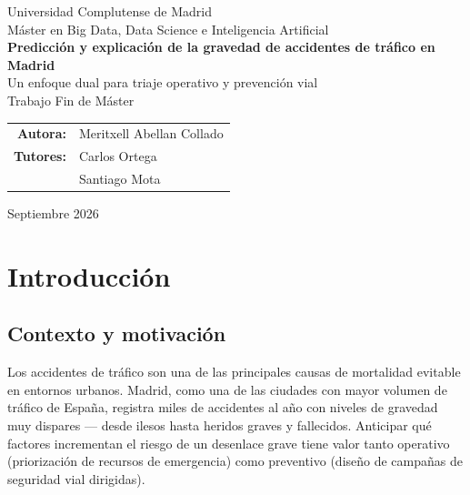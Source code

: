 \documentclass[11pt,a4paper]{article}
\begin{document}
\begin{titlepage}
\centering
\vspace*{1.5cm}

{\large Universidad Complutense de Madrid}\\[0.3cm]
{\large Máster en Big Data, Data Science e Inteligencia Artificial}\\[2.5cm]

{\Huge \bfseries Predicción y explicación de la gravedad de accidentes de tráfico en Madrid}\\[0.6cm]
{\Large Un enfoque dual para triaje operativo y prevención vial}\\[2.5cm]

{\large Trabajo Fin de Máster}\\[2cm]

\begin{tabular}{rl}
\textbf{Autora:} & Meritxell Abellan Collado \\[0.3cm]
\textbf{Tutores:} & Carlos Ortega \\
 & Santiago Mota \\
\end{tabular}

\vfill
{\large Septiembre 2026}

\end{titlepage}

\tableofcontents
\newpage

\listoffigures
\newpage

\section{Introducción}

\subsection{Contexto y motivación}

Los accidentes de tráfico son una de las principales causas de mortalidad evitable en entornos urbanos. Madrid, como una de las ciudades con mayor volumen de tráfico de España, registra miles de accidentes al año con niveles de gravedad muy dispares --- desde ilesos hasta heridos graves y fallecidos. Anticipar qué factores incrementan el riesgo de un desenlace grave tiene valor tanto operativo (priorización de recursos de emergencia) como preventivo (diseño de campañas de seguridad vial dirigidas).
\end{document}
